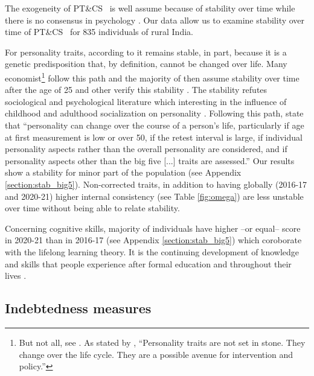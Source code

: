 \documentclass[a4paper, 11pt, onecolumn]{article}
\newcommand{\PTCS}{PT\&CS}
\begin{document}
The exogeneity of \PTCS~ is well assume because of stability over time while there is no consensus in psychology \citep{Ardelt2000, Deary2014}.
Our data allow us to examine stability over time of \PTCS~ for 835 individuals of rural India.

For personality traits, according to \cite{Costa1997, McCrae2000} it remains stable, in part, because it is a genetic predisposition that, by definition, cannot be changed over life.
Many economist\footnote{But not all, see \cite{Borghans2008, Almlund2011, Heckman2011}. As stated by \cite{Heckman2011}, ``Personality traits are not set in stone. They change over the life cycle. They are a possible avenue for intervention and policy.''} follow this path and the majority of then assume stability over time after the age of 25 and other verify this stability \citep{CobbClark2011}.
The stability refutes sociological and psychological literature which interesting in the influence of childhood and adulthood socialization on personality \citep{Mortimer1978, Moen1995}.
Following this path, \cite{Ardelt2000} state that ``personality can change over the course of a person's life, particularly if age at first measurement is low or over 50, if the retest interval is large, if individual personality aspects rather than the overall personality are considered, and if personality aspects other than the big five [...] traits are assessed.''
Our results show a stability for minor part of the population (see Appendix \ref{section:stab_big5}).
Non-corrected traits, in addition to having globally (2016-17 and 2020-21) higher internal consistency (see Table \ref{fig:omega}) are less unstable over time without being able to relate stability.

Concerning cognitive skills, majority of individuals have higher --or equal-- score in 2020-21 than in 2016-17 (see Appendix \ref{section:stab_big5}) which coroborate with the lifelong learning theory.
It is the continuing development of knowledge and skills that people experience after formal education and throughout their lives \citep{London2011}.



	\subsection{Indebtedness measures}
\end{document}
